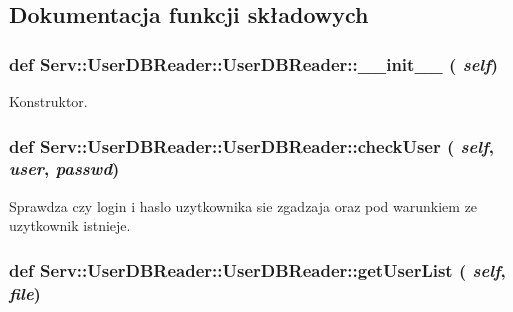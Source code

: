 \subsection{Dokumentacja funkcji składowych}
\hypertarget{class_serv_1_1_user_d_b_reader_1_1_user_d_b_reader_af3811b4b6123fe47153f9d87631322a9}{
\subsubsection[{\_\-\_\-init\_\-\_\-}]{\setlength{\rightskip}{0pt plus 5cm}def Serv::UserDBReader::UserDBReader::\_\-\_\-init\_\-\_\- ( {\em self})}}
\label{class_serv_1_1_user_d_b_reader_1_1_user_d_b_reader_af3811b4b6123fe47153f9d87631322a9}
\begin{DoxyVerb}Konstruktor.\end{DoxyVerb}
 \hypertarget{class_serv_1_1_user_d_b_reader_1_1_user_d_b_reader_a1fa47b601f3968090cf56b959f50ca94}{
\subsubsection[{checkUser}]{\setlength{\rightskip}{0pt plus 5cm}def Serv::UserDBReader::UserDBReader::checkUser ( {\em self}, \/   {\em user}, \/   {\em passwd})}}
\label{class_serv_1_1_user_d_b_reader_1_1_user_d_b_reader_a1fa47b601f3968090cf56b959f50ca94}
\begin{DoxyVerb}Sprawdza czy login i haslo uzytkownika sie zgadzaja oraz pod warunkiem ze uzytkownik istnieje.\end{DoxyVerb}
 \hypertarget{class_serv_1_1_user_d_b_reader_1_1_user_d_b_reader_a84890922ae8efd8ecec178874ec296f6}{
\subsubsection[{getUserList}]{\setlength{\rightskip}{0pt plus 5cm}def Serv::UserDBReader::UserDBReader::getUserList ( {\em self}, \/   {\em file})}}
